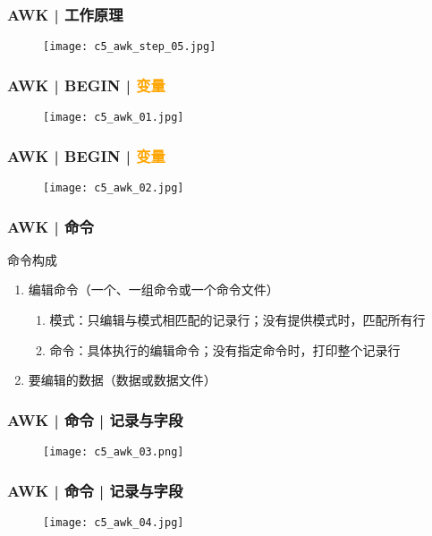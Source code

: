 \begin{frame}
  \frametitle{AWK | 工作原理}
  \begin{figure}
    \centering
    \texttt{[image: c5\_awk\_step\_05.jpg]}
  \end{figure}
\end{frame}

\begin{frame}
  \frametitle{AWK | BEGIN | \textcolor{orange}{变量}}
  \begin{figure}
    \centering
    \texttt{[image: c5\_awk\_01.jpg]}
  \end{figure}
\end{frame}

\begin{frame}
  \frametitle{AWK | BEGIN | \textcolor{orange}{变量}}
  \begin{figure}
    \centering
    \texttt{[image: c5\_awk\_02.jpg]}
  \end{figure}
\end{frame}

\begin{frame}
  \frametitle{AWK | \alert{命令}}
  \begin{block}{命令构成}
    \begin{enumerate}
      \item 编辑命令（一个、一组命令或一个命令文件）
        \begin{enumerate}
          \item 模式：只编辑与模式相匹配的记录行；没有提供模式时，匹配所有行
          \item 命令：具体执行的编辑命令；没有指定命令时，打印整个记录行
        \end{enumerate}
      \item 要编辑的数据（数据或数据文件）
    \end{enumerate}
  \end{block}
\end{frame}

\begin{frame}
  \frametitle{AWK | 命令 | \alert{记录与字段}}
  \begin{figure}
    \centering
    \texttt{[image: c5\_awk\_03.png]}
  \end{figure}
\end{frame}

\begin{frame}
  \frametitle{AWK | 命令 | \alert{记录与字段}}
  \begin{figure}
    \centering
    \texttt{[image: c5\_awk\_04.jpg]}
  \end{figure}
\end{frame}

